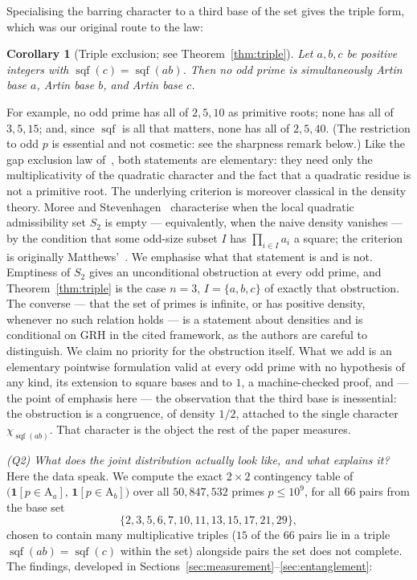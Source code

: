 \documentclass[11pt,reqno]{amsart}
\theoremstyle{plain}
\newtheorem{corollary}[theorem]{Corollary}
\theoremstyle{definition}
\DeclareMathOperator{\sqf}{sqf}
\newcommand{\Art}{\mathrm{A}}
\begin{document}
Specialising the barring character to a third base of the set gives the triple
form, which was our original route to the law:

\begin{corollary}[Triple exclusion; see Theorem~\ref{thm:triple}]
Let $a, b, c$ be positive integers with $\sqf(c) = \sqf(ab)$. Then no odd prime
is simultaneously Artin base $a$, Artin base $b$, and Artin base $c$.
\end{corollary}

For example, no odd prime has all of $2, 5, 10$ as primitive roots; none has
all of $3, 5, 15$; and, since $\sqf$ is all that matters, none has all of
$2, 5, 40$. (The restriction to odd $p$ is essential and not cosmetic: see the
sharpness remark below.) Like the gap exclusion law of~\cite{BaldII}, both statements are
elementary: they need only the multiplicativity of the quadratic character and
the fact that a quadratic residue is not a primitive root. The underlying criterion
is moreover classical in the density theory. Moree and
Stevenhagen~\cite[\S5, (5.2)]{MoreeStevenhagen2014} characterise when the
local quadratic admissibility set $S_2$ is empty --- equivalently, when the
naive density vanishes --- by the condition that some odd-size subset $I$ has
$\prod_{i \in I} a_i$ a square; the criterion is originally
Matthews'~\cite{Matthews1976}. We emphasise what that statement is and is
not. Emptiness of $S_2$ gives an unconditional obstruction at every odd prime,
and Theorem~\ref{thm:triple} is the case $n = 3$, $I = \{a,b,c\}$ of exactly
that obstruction. The converse --- that the set of primes is infinite, or has
positive density, whenever no such relation holds --- is a statement about
densities and is conditional on GRH in the cited framework, as the authors are
careful to distinguish. We claim no priority for the obstruction itself. What
we add is an elementary pointwise formulation valid at every odd prime with no
hypothesis of any kind, its extension to square bases and to $1$, a
machine-checked proof, and --- the point of emphasis here --- the observation
that the third base is inessential: the obstruction is a congruence, of
density $1/2$, attached to the single character $\chi_{\sqf(ab)}$. That character is the object the rest of the paper measures.

\emph{(Q2) What does the joint distribution actually look like, and what
explains it?} Here the data speak. We compute the exact $2 \times 2$
contingency table of $\bigl(\mathbf{1}[p \in \Art_a],\,
\mathbf{1}[p \in \Art_b]\bigr)$ over all $50{,}847{,}532$ primes
$p \le 10^9$, for all $66$ pairs from the base set
\[
  \{2, 3, 5, 6, 7, 10, 11, 13, 15, 17, 21, 29\},
\]
chosen to contain many multiplicative triples ($15$ of the $66$ pairs lie in
a triple $\sqf(ab) = \sqf(c)$ within the set) alongside pairs the set does not complete. The findings, developed in
Sections~\ref{sec:measurement}--\ref{sec:entanglement}:
\end{document}
